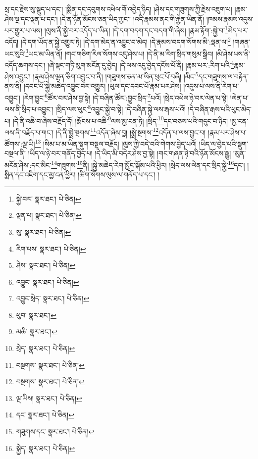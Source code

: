 སྲ་དང་རྗེས་སུ་སྡུད་པ་དང་། །སྨིན་དང་དབུགས་འཕེལ་གོ་འབྱེད་ཉིད། །ཤེས་དང་གཟུགས་ཀྱི་རྗེས་འཇུག་པ། །རྣམ་ཤེས་ལྔ་དང་ལྡན་པ་དང་། །དེ་ན་ཉོན་མོངས་ཅན་ཡིད་ཀྱང་། །འདི་རྣམས་ནང་གི་རྐྱེན་ཡིན་ནོ། །ཁམས་རྣམས་འདུས་པར་གྱུར་པ་ལས། །ལུས་ནི་སྐྱེ་བར་འདོད་པ་ཡིན། །དེ་དག་བདག་དང་བདག་གི་ཞེས། །རྣམ་རྟོག་:སྐྱེ་བ་\footnote{སྐྱེ་བར་  སྣར་ཐང་།  པེ་ཅིན། }མེད་པར་འདོད། །དེ་དག་ཡོད་ན་སྐྱེ་འགྱུར་ཏེ། །དེ་དག་མེད་ན་འབྱུང་བ་མེད། །དེ་རྣམས་བདག་སོགས་མི་:ལྡན་ལ།\footnote{ལྡན་པ།  སྣར་ཐང་།  པེ་ཅིན། } །གཞན་ཡང་སུའི་\footnote{སུ་  སྣར་ཐང་།  པེ་ཅིན། }ཡང་མ་ཡིན་ནོ། །གང་གཅིག་རིལ་སོགས་འདུ་ཤེས་པ། །དེ་ནི་མ་རིག་སྲིད་གསུམ་སྒྲིབ། །མི་ཤེས་པས་ནི་འདོད་ཆགས་དང་། །ཞེ་སྡང་གཏི་མུག་མངོན་དུ་བྱེད། །དེ་ལས་འདུ་བྱེད་དངོས་པོ་ནི། །རྣམ་པར་:རིག་པའི་\footnote{རིག་པས་  སྣར་ཐང་།  པེ་ཅིན། }རྣམ་ཤེས་འབྱུང་། །རྣམ་ཤེས་ལྷན་ཅིག་འབྱུང་བ་ནི། །གཟུགས་ཅན་མ་ཡིན་ཕུང་པོ་བཞི། །མིང་\footnote{ཤེས་  སྣར་ཐང་།  པེ་ཅིན། }དང་གཟུགས་ལ་བརྟེན་ནས་ནི། །དབང་པོ་སྐྱེ་མཆེད་འབྱུང་བར་འགྱུར། །ཡུལ་དང་དབང་པོ་རྣམ་པར་ཤེས། །འདུས་པ་ལས་ནི་རེག་པ་འབྱུང་། །རེག་བྱུང་\footnote{འབྱུང་  སྣར་ཐང་།  པེ་ཅིན། }ཚོར་བར་ཤེས་བྱ་སྟེ། །དེ་བཞིན་ཚོར་:བྱུང་སྲིད་\footnote{འབྱུང་སྲེད་  སྣར་ཐང་།  པེ་ཅིན། }པའོ། །སྲེད་འཕེལ་ཉེ་བར་ལེན་པ་སྟེ། །ལེན་པ་ལས་ནི་སྲིད་པ་འབྱུང་། །སྲིད་ལས་ཕུང་\footnote{ཕུབ་  སྣར་ཐང་། }འབྱུང་སྐྱེ་བ་སྟེ། །དེ་བཞིན་སྐྱེ་ལས་རྒས་པའོ། །དེ་བཞིན་རྒས་པའི་ཕུང་མེད་པ། །དེ་ནི་འཆི་བ་ཞེས་བརྗོད་དོ། །རྨོངས་པ་འཆི་\footnote{མཆི་  སྣར་ཐང་། }ལས་མྱ་ངན་ཏེ། །སྲིད་\footnote{སྲེད་  སྣར་ཐང་།  པེ་ཅིན། }དང་བཅས་པའི་གདུང་བ་ཉིད། །མྱ་ངན་ལས་ནི་བརྗོད་པ་གང་། །དེ་ནི་སྨྲེ་སྔགས་\footnote{བསྔགས་  སྣར་ཐང་།  པེ་ཅིན། }འདོན་ཞེས་བྱ། །སྨྲེ་སྔགས་\footnote{བསྔགས་  སྣར་ཐང་།  པེ་ཅིན། }འདོན་པ་ལས་བྱུང་བ། །རྣམ་པར་ཤེས་པ་ཚོགས་:ལྔ་ཡི།\footnote{ལྔ་ཡིས།  སྣར་ཐང་།  པེ་ཅིན། } །སིམ་པ་མ་ཡིན་སྡུག་བསྔལ་བརྗོད། །ལུས་ཀྱི་བདེ་བའི་གེགས་བྱེད་པའོ། །ཡིད་ལ་བྱེད་པའི་སྡུག་བསྔལ་ནི། །ཡིད་ལ་ཉེ་བར་གནོད་བྱེད་པ། །དེ་ཡིད་མི་བདེར་ཤེས་བྱ་སྟེ། །གང་གཞན་ཉེ་བའི་ཉོན་མོངས་རྒྱུ། །མུན་མངོན་ཤེས་:དང་མིང་\footnote{དང་  སྣར་ཐང་།  པེ་ཅིན། }གཟུགས་\footnote{གཟུགས་དང་  སྣར་ཐང་།  པེ་ཅིན། }ནི། །སྐྱེ་མཆེད་རེག་མྱོང་སྐོམ་པའི་ཕྱིར། །སྲེད་ལས་ལེན་དང་སྲིད་སྐྱེ་\footnote{སྐྱེད་  སྣར་ཐང་།  པེ་ཅིན། }དང་། །སྨིན་དང་འཇིག་དང་མྱ་ངན་ཕྱིར། །ཚིག་སོགས་ལུས་ལ་གནོད་པ་དང་། །
